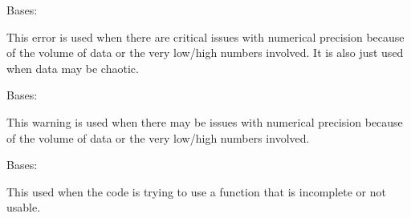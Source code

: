 \documentclass[letterpaper,10pt,english]{sphinxmanual}
\begin{document}

\begin{fulllineitems}
\label{\detokenize{python_docstrings/IfA_Smeargle.meta.errors:IfA_Smeargle.meta.errors.ImprecisionError}}
Bases: {\hyperref[\detokenize{python_docstrings/IfA_Smeargle.meta.errors:IfA_Smeargle.meta.errors.Smeargle_Exception}]{}}

This error is used when there are critical issues with numerical
precision because of the volume of data or the very low/high numbers
involved. It is also just used when data may be chaotic.

\end{fulllineitems}


\begin{fulllineitems}
\label{\detokenize{python_docstrings/IfA_Smeargle.meta.errors:IfA_Smeargle.meta.errors.ImprecisionWarning}}
Bases: {\hyperref[\detokenize{python_docstrings/IfA_Smeargle.meta.errors:IfA_Smeargle.meta.errors.Smeargle_Warning}]{}}

This warning is used when there may be issues with numerical precision
because of the volume of data or the very low/high numbers involved.

\end{fulllineitems}


\begin{fulllineitems}
\label{\detokenize{python_docstrings/IfA_Smeargle.meta.errors:IfA_Smeargle.meta.errors.IncompleteError}}
Bases: {\hyperref[\detokenize{python_docstrings/IfA_Smeargle.meta.errors:IfA_Smeargle.meta.errors.Smeargle_BaseException}]{}}

This used when the code is trying to use a function that is incomplete or
not usable.

\end{fulllineitems}
\end{document}
